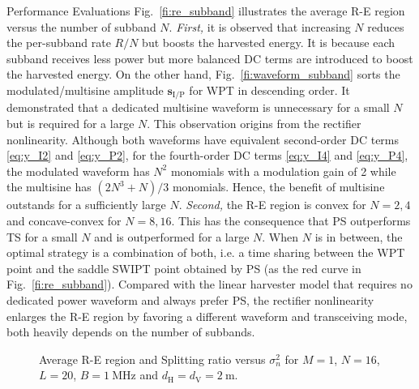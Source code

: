 \documentclass[journal]{IEEEtran}
\begin{document}
\begin{section}{Performance Evaluations}
		Fig.~\ref{fi:re_subband} illustrates the average R-E region versus the number of subband $N$. \textit{First,} it is observed that increasing $N$ reduces the per-subband rate $R/N$ but boosts the harvested energy. It is because each subband receives less power but more balanced DC terms are introduced to boost the harvested energy. On the other hand, Fig.~\ref{fi:waveform_subband} sorts the modulated/multisine amplitude $\boldsymbol{s}_{\mathrm{I/P}}$ for WPT in descending order. It demonstrated that a dedicated multisine waveform is unnecessary for a small $N$ but is required for a large $N$. This observation origins from the rectifier nonlinearity. Although both waveforms have equivalent second-order DC terms \eqref{eq:y_I2} and \eqref{eq:y_P2}, for the fourth-order DC terms \eqref{eq:y_I4} and \eqref{eq:y_P4}, the modulated waveform has $N^2$ monomials with a modulation gain of \num{2} while the multisine has $(2N^3+N)/3$ monomials. Hence, the benefit of multisine outstands for a sufficiently large $N$. \textit{Second,} the R-E region is convex for $N = 2, 4$ and concave-convex for $N = 8, 16$. This has the consequence that PS outperforms TS for a small $N$ and is outperformed for a large $N$. When $N$ is in between, the optimal strategy is a combination of both, i.e. a time sharing between the WPT point and the saddle SWIPT point obtained by PS (as the red curve in Fig.~\ref{fi:re_subband}). Compared with the linear harvester model that requires no dedicated power waveform and always prefer PS, the rectifier nonlinearity enlarges the R-E region by favoring a different waveform and transceiving mode, both heavily depends on the number of subbands.

		\begin{figure}[!t]
			\centering
			\caption{Average R-E region and Splitting ratio versus $\sigma_n^2$ for $M=1$, $N=16$, $L=20$, $B=\SI{1}{\MHz}$ and $d_{\mathrm{H}}=d_{\mathrm{V}}=\SI{2}{\meter}$.}
		\end{figure}


\end{section}
\end{document}
